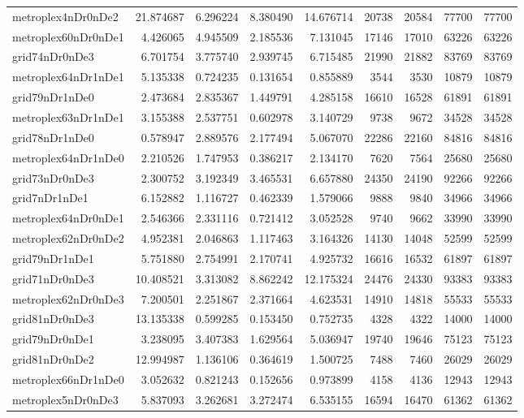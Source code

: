 \begin{longtable}{|l|r|r|r|r|r|r|r|r|}
metroplex4nDr0nDe2 & 21.874687 & 6.296224 & 8.380490 & 14.676714 & 20738 & 20584 & 77700 & 77700 \\
metroplex60nDr0nDe1 & 4.426065 & 4.945509 & 2.185536 & 7.131045 & 17146 & 17010 & 63226 & 63226 \\
grid74nDr0nDe3 & 6.701754 & 3.775740 & 2.939745 & 6.715485 & 21990 & 21882 & 83769 & 83769 \\
metroplex64nDr1nDe1 & 5.135338 & 0.724235 & 0.131654 & 0.855889 & 3544 & 3530 & 10879 & 10879 \\
grid79nDr1nDe0 & 2.473684 & 2.835367 & 1.449791 & 4.285158 & 16610 & 16528 & 61891 & 61891 \\
metroplex63nDr1nDe1 & 3.155388 & 2.537751 & 0.602978 & 3.140729 & 9738 & 9672 & 34528 & 34528 \\
grid78nDr1nDe0 & 0.578947 & 2.889576 & 2.177494 & 5.067070 & 22286 & 22160 & 84816 & 84816 \\
metroplex64nDr1nDe0 & 2.210526 & 1.747953 & 0.386217 & 2.134170 & 7620 & 7564 & 25680 & 25680 \\
grid73nDr0nDe3 & 2.300752 & 3.192349 & 3.465531 & 6.657880 & 24350 & 24190 & 92266 & 92266 \\
grid7nDr1nDe1 & 6.152882 & 1.116727 & 0.462339 & 1.579066 & 9888 & 9840 & 34966 & 34966 \\
metroplex64nDr0nDe1 & 2.546366 & 2.331116 & 0.721412 & 3.052528 & 9740 & 9662 & 33990 & 33990 \\
metroplex62nDr0nDe2 & 4.952381 & 2.046863 & 1.117463 & 3.164326 & 14130 & 14048 & 52599 & 52599 \\
grid79nDr1nDe1 & 5.751880 & 2.754991 & 2.170741 & 4.925732 & 16616 & 16532 & 61897 & 61897 \\
grid71nDr0nDe3 & 10.408521 & 3.313082 & 8.862242 & 12.175324 & 24476 & 24330 & 93383 & 93383 \\
metroplex62nDr0nDe3 & 7.200501 & 2.251867 & 2.371664 & 4.623531 & 14910 & 14818 & 55533 & 55533 \\
grid81nDr0nDe3 & 13.135338 & 0.599285 & 0.153450 & 0.752735 & 4328 & 4322 & 14000 & 14000 \\
grid79nDr0nDe1 & 3.238095 & 3.407383 & 1.629564 & 5.036947 & 19740 & 19646 & 75123 & 75123 \\
grid81nDr0nDe2 & 12.994987 & 1.136106 & 0.364619 & 1.500725 & 7488 & 7460 & 26029 & 26029 \\
metroplex66nDr1nDe0 & 3.052632 & 0.821243 & 0.152656 & 0.973899 & 4158 & 4136 & 12943 & 12943 \\
metroplex5nDr0nDe3 & 5.837093 & 3.262681 & 3.272474 & 6.535155 & 16594 & 16470 & 61362 & 61362 \\

\end{longtable}
